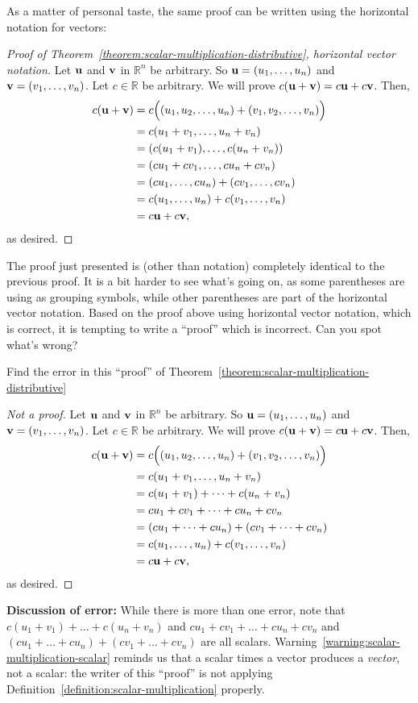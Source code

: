 \documentclass{book}
\theoremstyle{ekimcustom}
\begin{document}
As a matter of personal taste, the same proof can be written using the horizontal notation for vectors:
\begin{proof}[Proof of Theorem~\ref{theorem:scalar-multiplication-distributive}, horizontal vector notation]
Let ${\bf u}$ and ${\bf v}$ in $\mathbb{R}^n$ be arbitrary. So ${\bf u} = (u_1,\dots,u_n)$ and ${\bf v} = (v_1,\dots,v_n)$. Let $c \in \mathbb{R}$ be arbitrary. We will prove $c({\bf u}+{\bf v}) = c{\bf u} + c{\bf v}$. Then,
\begin{align*}
c({\bf u}+{\bf v})
&= c\Big( (u_1,u_2,\dots,u_n)
+
(v_1,v_2,\dots,v_n) \Big)\\
&= c(u_1+v_1,\dots,u_n+v_n)\\
&= (c(u_1+v_1),\dots,c(u_n+v_n))\\
&= (cu_1+cv_1,\dots,cu_n+cv_n)\\
&= (cu_1,\dots,cu_n)+(cv_1,\dots,cv_n)\\
&= c(u_1,\dots,u_n)+c(v_1,\dots,v_n)\\
&=c{\bf u}+c{\bf v},
\end{align*}
as desired.
\end{proof}
The proof just presented is (other than notation) completely identical to the previous proof. It is a bit harder to see what's going on, as some parentheses are using as grouping symbols, while other parentheses are part of the horizontal vector notation. Based on the proof above using horizontal vector notation, which is correct, it is tempting to write a ``proof'' which is incorrect. Can you spot what's wrong?
\begin{bwarning}{Find the error in this ``proof'' of Theorem~\ref{theorem:scalar-multiplication-distributive}}{}
\begin{proof}[Not a proof]
Let ${\bf u}$ and ${\bf v}$ in $\mathbb{R}^n$ be arbitrary. So ${\bf u} = (u_1,\dots,u_n)$ and ${\bf v} = (v_1,\dots,v_n)$. Let $c \in \mathbb{R}$ be arbitrary. We will prove $c({\bf u}+{\bf v}) = c{\bf u} + c{\bf v}$. Then,
\begin{align*}
c({\bf u}+{\bf v})
&= c\Big( (u_1,u_2,\dots,u_n)
+
(v_1,v_2,\dots,v_n) \Big)\\
&= c(u_1+v_1,\dots,u_n+v_n)\\
&= c(u_1+v_1)+\dots+c(u_n+v_n)\\
&= cu_1+cv_1+\dots+cu_n+cv_n\\
&= (cu_1+\dots+cu_n)+(cv_1+\dots+cv_n)\\
&= c(u_1,\dots,u_n)+c(v_1,\dots,v_n)\\
&=c{\bf u}+c{\bf v},
\end{align*}
as desired.
\end{proof}
{\bf Discussion of error:} While there is more than one error, note that $c(u_1+v_1)+\dots+c(u_n+v_n)$ and $cu_1+cv_1+\dots+cu_n+cv_n$ and $(cu_1+\dots+cu_n)+(cv_1+\dots+cv_n)$ are all scalars. Warning~\ref{warning:scalar-multiplication-scalar} reminds us that a scalar times a vector produces a \emph{vector}, not a scalar: the writer of this ``proof'' is not applying Definition~\ref{definition:scalar-multiplication} properly.
\end{bwarning}
\end{document}
